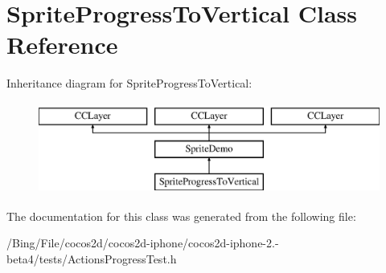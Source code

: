 \hypertarget{interface_sprite_progress_to_vertical}{\section{Sprite\-Progress\-To\-Vertical Class Reference}
\label{interface_sprite_progress_to_vertical}
}
Inheritance diagram for Sprite\-Progress\-To\-Vertical\-:\begin{figure}[H]
\begin{center}
\leavevmode
\includegraphics[height=3.000000cm]{interface_sprite_progress_to_vertical}
\end{center}
\end{figure}


The documentation for this class was generated from the following file\-:\begin{DoxyCompactItemize}
\item 
/\-Bing/\-File/cocos2d/cocos2d-\/iphone/cocos2d-\/iphone-\/2.-\/beta4/tests/Actions\-Progress\-Test.\-h\end{DoxyCompactItemize}
